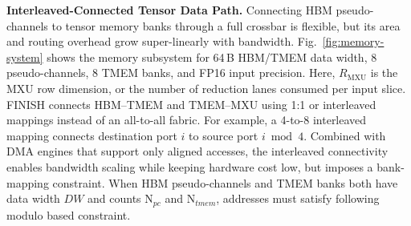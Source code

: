 \documentclass[sigconf,anonymous,nonacm]{acmart}
\newcommand{\ours}{\textsc{FINISH}}
\begin{document}
\textbf{Interleaved-Connected Tensor Data Path.}
Connecting HBM pseudo-channels to tensor memory banks through a full crossbar is flexible, but its area and routing overhead grow super-linearly with bandwidth. Fig.~\ref{fig:memory-system} shows the memory subsystem for 64\,B HBM/TMEM data width, 8 pseudo-channels, 8 TMEM banks, and FP16 input precision. Here, $R_{\mathrm{MXU}}$ is the MXU row dimension, or the number of reduction lanes consumed per input slice. \ours{} connects HBM--TMEM and TMEM--MXU using 1:1 or interleaved mappings instead of an all-to-all fabric. For example, a 4-to-8 interleaved mapping connects destination port $i$ to source port $i \bmod 4$. 
Combined with DMA engines that support only aligned accesses, the interleaved connectivity enables bandwidth scaling while keeping hardware cost low, but imposes a bank-mapping constraint.
When HBM pseudo-channels and TMEM banks both have data width $DW$ and counts $\mathrm{N}_{pc}$ and $\mathrm{N}_{tmem}$, addresses must satisfy following modulo based constraint.
\end{document}
